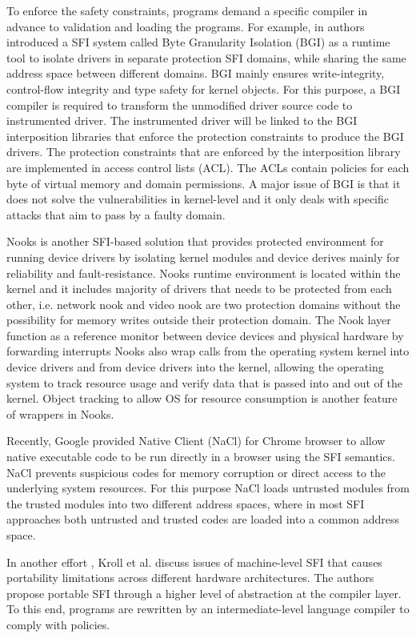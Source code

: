 To enforce the safety constraints, programs demand a specific compiler in advance to validation and loading the programs. For example, in \cite{Castro-BGI} authors introduced a SFI system called Byte Granularity Isolation (BGI) as a runtime tool to isolate drivers in separate protection SFI domains, while sharing the same address space between different domains. BGI mainly ensures write-integrity, control-flow integrity and type safety for kernel objects. For this purpose, a BGI compiler is required to transform the unmodified driver source code to instrumented driver. The instrumented driver will be linked to the BGI interposition libraries that enforce the protection constraints to produce the BGI drivers. The protection constraints that are enforced by the interposition library are implemented in access control lists (ACL). The ACLs contain policies for each byte of virtual memory and domain permissions. A major issue of BGI is that it does not solve the vulnerabilities in kernel-level and it only deals with specific attacks that aim to pass by a faulty domain.


Nooks \cite{Nooks:03} is another SFI-based solution that provides protected environment for running device drivers by isolating kernel modules and device derives mainly for reliability and fault-resistance. Nooks runtime environment is located within the kernel and it includes majority of drivers that needs to be protected from each other, i.e. network nook and video nook are two protection domains without the possibility for memory writes outside their protection domain. The Nook layer function as a reference monitor between device devices and physical hardware by forwarding interrupts  Nooks also wrap calls from the operating system kernel into device drivers and from device drivers into the kernel, allowing the operating system to track resource usage and verify data that is passed into and out of the kernel. Object tracking to allow OS for resource consumption is another feature of wrappers in Nooks. 

Recently, Google provided Native Client (NaCl) \cite{NaCl-09} for Chrome browser to allow native executable code to be run directly in a browser using the SFI semantics. NaCl prevents suspicious codes for memory corruption or direct access to the underlying system resources. For this purpose NaCl loads untrusted modules from the trusted modules into two different address spaces, where in most SFI approaches both untrusted and trusted codes are loaded into a common address space. 

In another effort \cite{PSFI}, Kroll et al. discuss issues of machine-level SFI that causes portability limitations across different hardware architectures. The authors propose portable SFI through a higher level of abstraction at the compiler layer. To this end, programs are rewritten by an intermediate-level language compiler to comply with policies.














